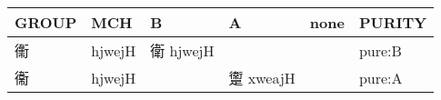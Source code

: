 \documentclass[14pt,a4paper]{scrartcl}
\begin{document}
\begin{longtable}[c]{@{}llllll@{}}
\toprule
\begin{minipage}[b]{0.14\columnwidth}\raggedright\strut
GROUP
\strut\end{minipage} &
\begin{minipage}[b]{0.14\columnwidth}\raggedright\strut
MCH
\strut\end{minipage} &
\begin{minipage}[b]{0.14\columnwidth}\raggedright\strut
B
\strut\end{minipage} &
\begin{minipage}[b]{0.14\columnwidth}\raggedright\strut
A
\strut\end{minipage} &
\begin{minipage}[b]{0.14\columnwidth}\raggedright\strut
none
\strut\end{minipage} &
\begin{minipage}[b]{0.14\columnwidth}\raggedright\strut
PURITY
\strut\end{minipage}\tabularnewline
\midrule
\endhead
\begin{minipage}[t]{0.14\columnwidth}\raggedright\strut
䘙
\strut\end{minipage} &
\begin{minipage}[t]{0.14\columnwidth}\raggedright\strut
hjwejH
\strut\end{minipage} &
\begin{minipage}[t]{0.14\columnwidth}\raggedright\strut
衛 hjwejH
\strut\end{minipage} &
\begin{minipage}[t]{0.14\columnwidth}\raggedright\strut
\strut\end{minipage} &
\begin{minipage}[t]{0.14\columnwidth}\raggedright\strut
\strut\end{minipage} &
\begin{minipage}[t]{0.14\columnwidth}\raggedright\strut
pure:B
\strut\end{minipage}\tabularnewline
\begin{minipage}[t]{0.14\columnwidth}\raggedright\strut
衞
\strut\end{minipage} &
\begin{minipage}[t]{0.14\columnwidth}\raggedright\strut
hjwejH
\strut\end{minipage} &
\begin{minipage}[t]{0.14\columnwidth}\raggedright\strut
\strut\end{minipage} &
\begin{minipage}[t]{0.14\columnwidth}\raggedright\strut
躛 xweajH
\strut\end{minipage} &
\begin{minipage}[t]{0.14\columnwidth}\raggedright\strut
\strut\end{minipage} &
\begin{minipage}[t]{0.14\columnwidth}\raggedright\strut
pure:A
\strut\end{minipage}\tabularnewline
\bottomrule
\end{longtable}
\end{document}
